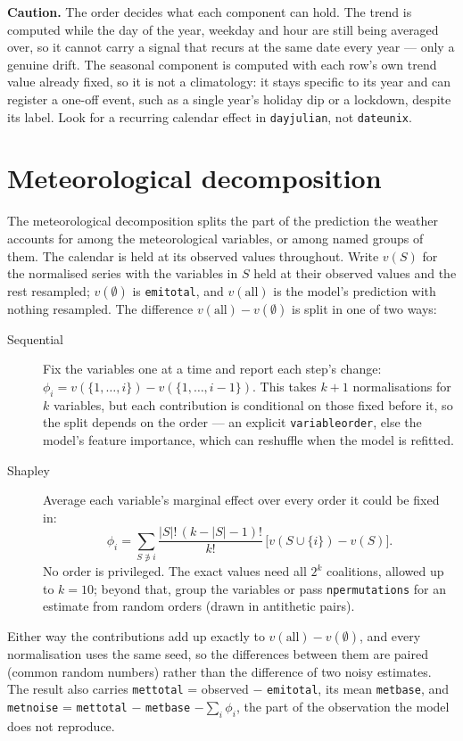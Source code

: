\documentclass[11pt]{report}
\newcommand{\codeunderscore}{\textunderscore\allowbreak}
\newcommand{\code}[1]{\texttt{\let\_\codeunderscore #1}}
\newcommand{\caution}[1]{\par\noindent\colorbox{warn!15}{\parbox{0.97\linewidth}{\small\textbf{Caution.} #1}}\par}
\begin{document}
\caution{The order decides what each component can hold. The trend is computed while the
day of the year, weekday and hour are still being averaged over, so it cannot carry a
signal that recurs at the same date every year --- only a genuine drift. The seasonal
component is computed with each row's own trend value already fixed, so it is not a
climatology: it stays specific to its year and can register a one-off event, such as a
single year's holiday dip or a lockdown, despite its label. Look for a recurring calendar
effect in \code{day\_julian}, not \code{date\_unix}.}

\section{Meteorological decomposition}\label{sec:metdecomp}
The meteorological decomposition splits the part of the prediction the weather accounts
for among the meteorological variables, or among named groups of them. The calendar is
held at its observed values throughout. Write $v(S)$ for the normalised series with the
variables in $S$ held at their observed values and the rest resampled; $v(\emptyset)$ is
\code{emi\_total}, and $v(\text{all})$ is the model's prediction with nothing resampled.
The difference $v(\text{all}) - v(\emptyset)$ is split in one of two ways:
\begin{description}
  \item[Sequential] Fix the variables one at a time and report each step's change:
        $\phi_i = v(\{1,\dots,i\}) - v(\{1,\dots,i-1\})$. This takes $k+1$
        normalisations for $k$ variables, but each contribution is conditional on those
        fixed before it, so the split depends on the order --- an explicit
        \code{variable\_order}, else the model's feature importance, which can reshuffle
        when the model is refitted.
  \item[Shapley] Average each variable's marginal effect over every order it could be
        fixed in:
        \begin{equation}
          \phi_i = \sum_{S \not\ni i} \frac{|S|!\,(k-|S|-1)!}{k!}\,
                   \bigl[v(S\cup\{i\}) - v(S)\bigr].
        \end{equation}
        No order is privileged. The exact values need all $2^k$ coalitions, allowed up
        to $k=10$; beyond that, group the variables or pass \code{n\_permutations} for
        an estimate from random orders (drawn in antithetic pairs).
\end{description}
Either way the contributions add up exactly to $v(\text{all}) - v(\emptyset)$, and every
normalisation uses the same seed, so the differences between them are paired (common
random numbers) rather than the difference of two noisy estimates. The result also
carries \code{met\_total} = observed $-$ \code{emi\_total}, its mean \code{met\_base},
and \code{met\_noise} = \code{met\_total} $-$ \code{met\_base} $-\sum_i\phi_i$, the part
of the observation the model does not reproduce.
\end{document}
